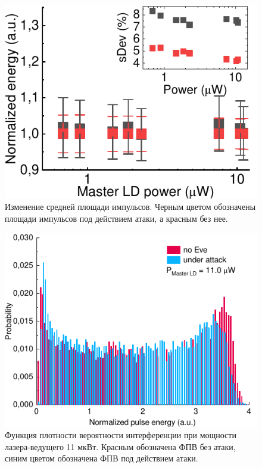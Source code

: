 \begin{figure}%
	\includegraphics[width=\linewidth]{images/area_under_attack.pdf}
	\caption{Изменение средней площади импульсов. Черным цветом обозначены площади импульсов под действием атаки, а красным без нее.}
	\label{fig:area}
\end{figure}


\begin{figure}
	\includegraphics[width=\linewidth]{images/hist_attack_11.pdf}
	\caption{Функция плотности вероятности интерференции при мощности лазера-ведущего 11 мкВт. Красным обозначена ФПВ без атаки, синим цветом обозначена ФПВ под действием атаки.}
	\label{fig:histogram_max}
\end{figure}


